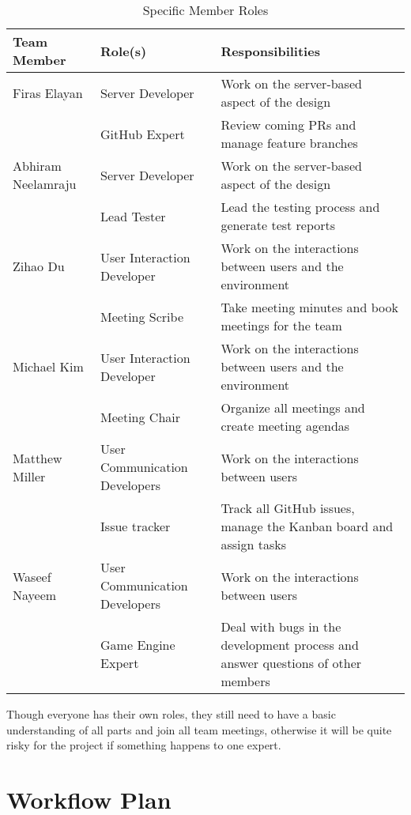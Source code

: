 \documentclass{article}
\begin{document}
\begin{table}[H]
	\centering
	\caption{Specific Member Roles}
	\vspace{5pt}
	\begin{tabular}{|p{}|p{}|p{}|}
		\hline
		\textbf{Team Member} & \textbf{Role(s)} & \textbf{Responsibilities} \\
		\hline
		  Firas Elayan & Server Developer & Work on the server-based aspect of the design\\
		  \cline{2-3} & GitHub Expert & Review coming PRs and manage feature branches\\
		\hline
            Abhiram Neelamraju & Server Developer & Work on the server-based aspect of the design\\
            \cline{2-3} & Lead Tester & Lead the testing process and generate test reports\\
		\hline
		  Zihao Du & User Interaction Developer & Work on the interactions between users and the environment\\
            \cline{2-3} & Meeting Scribe & Take meeting minutes and book meetings for the team\\
		\hline
		  Michael Kim & User Interaction Developer & Work on the interactions between users and the environment\\
		  \cline{2-3} & Meeting Chair & Organize all meetings and create meeting agendas\\
        \hline
            Matthew Miller & User Communication Developers & Work on the interactions between users\\
		  \cline{2-3} & Issue tracker & Track all GitHub issues, manage the Kanban board and assign tasks\\
		\hline
            Waseef Nayeem & User Communication Developers & Work on the interactions between users\\
		  \cline{2-3} & Game Engine Expert & Deal with bugs in the development process and answer questions of other      members\\
		\hline
	\end{tabular}
\end{table}
Though everyone has their own roles, they still need to have a basic understanding of all parts and join all team meetings, otherwise it will be quite risky for the project if something happens to one expert.

\section{Workflow Plan}
\end{document}
